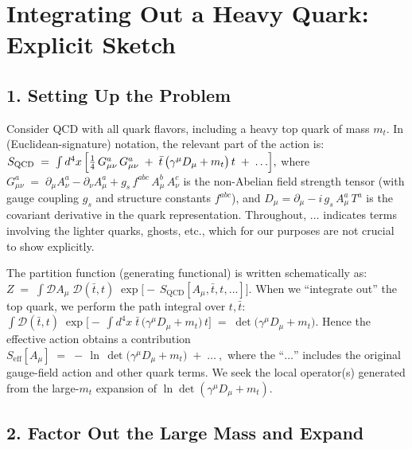 \documentclass[11pt]{article}
\begin{document}
\section*{Integrating Out a Heavy Quark: Explicit Sketch}

\subsection*{1. Setting Up the Problem}

Consider QCD with all quark flavors, including a heavy top quark of mass $m_t$.
In (Euclidean-signature) notation, the relevant part of the action is:
$

  S_{\text{QCD}} \;=\; \int d^4x \,\Bigl[
    \tfrac{1}{4}\,G_{\mu\nu}^a\,G_{\mu\nu}^a
    \;+\;\bar{t}\,\bigl(\gamma^\mu D_\mu + m_t\bigr)\,t
    \;+\;\ldots
  \Bigr],

$
where
$

  G_{\mu\nu}^a \;=\;\partial_\mu A_\nu^a - \partial_\nu A_\mu^a + g_s\,f^{abc}\,A_\mu^b\,A_\nu^c

$
is the non-Abelian field strength tensor (with gauge coupling $g_s$ and structure constants $f^{abc}$), and $D_\mu = \partial_\mu - i\,g_s\,A_\mu^a\,T^a$ is the covariant derivative in the quark representation. Throughout, $\ldots$ indicates terms involving the lighter quarks, ghosts, etc., which for our purposes are not crucial to show explicitly.

The partition function (generating functional) is written schematically as:
$

  Z \;=\; \int \!\mathcal{D}A_\mu\;\mathcal{D}(\bar{t},t)\;\exp\!\bigl[
    -\,S_{\text{QCD}}[A_\mu,\bar{t},t,\ldots]
  \bigr].

$
When we ``integrate out'' the top quark, we perform the path integral over $t,\bar{t}$:
$

  \int \!\mathcal{D}(\bar{t},t)\;\exp\!\bigl[
    -\,\int d^4x\;\bar{t}\,\bigl(\gamma^\mu D_\mu + m_t\bigr)\,t
  \bigr]
  \;=\;
  \det\!\bigl(\gamma^\mu D_\mu + m_t\bigr).

$
Hence the effective action obtains a contribution
$

  S_{\text{eff}}[A_\mu]
  \;=\;
  -\,\ln\,\det\!\bigl(\gamma^\mu D_\mu + m_t\bigr) \;+\; \ldots~,

$
where the ``$\ldots$'' includes the original gauge-field action and other quark terms. We seek the local operator(s) generated from the large-$m_t$ expansion of $\ln\det(\gamma^\mu D_\mu + m_t)$.

\subsection*{2. Factor Out the Large Mass and Expand}
\end{document}
